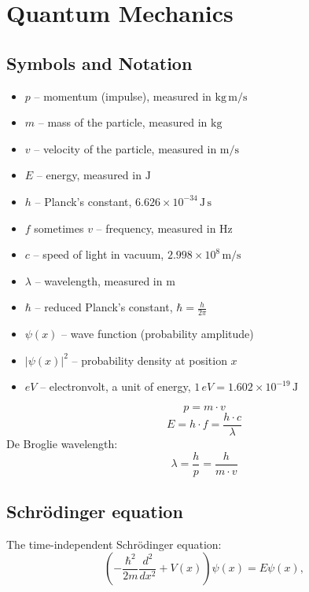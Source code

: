 \section{Quantum Mechanics}
\subsection{Symbols and Notation}
\begin{itemize}
    \item $p$ -- momentum (impulse), measured in $\mathrm{kg\,m/s}$
    \item $m$ -- mass of the particle, measured in $\mathrm{kg}$
    \item $v$ -- velocity of the particle, measured in $\mathrm{m/s}$
    \item $E$ -- energy, measured in $\mathrm{J}$
    \item $h$ -- Planck's constant, $6.626 \times 10^{-34}\,\mathrm{J\,s}$
    \item $f$ sometimes $v$ -- frequency, measured in $\mathrm{Hz}$
    \item $c$ -- speed of light in vacuum, $2.998 \times 10^8\,\mathrm{m/s}$
    \item $\lambda$ -- wavelength, measured in $\mathrm{m}$
    \item $\hbar$ -- reduced Planck's constant, $\hbar = \frac{h}{2\pi}$
    \item $\psi(x)$ -- wave function (probability amplitude)
    \item $|\psi(x)|^2$ -- probability density at position $x$
    \item \(eV\) -- electronvolt, a unit of energy, \(1\,eV = 1.602 \times 10^{-19}\,\mathrm{J}\)
\end{itemize}
\begin{equation*}
    p = m \cdot v
\end{equation*}
\begin{equation*}
    E = h \cdot f = \frac{h \cdot c}{\lambda}
\end{equation*}
De Broglie wavelength:
\begin{equation*}
    \lambda = \frac{h}{p} = \frac{h}{m \cdot v}
\end{equation*}
\subsection{Schrödinger equation}
The time-independent Schrödinger equation:
\begin{equation*}
    \label{eq:time-independent-schroedinger}
\left(-\frac{\hbar^2}{2m} \frac{d^2}{dx^2} + V(x)\right) \psi(x) = E \psi(x),
\end{equation*}

